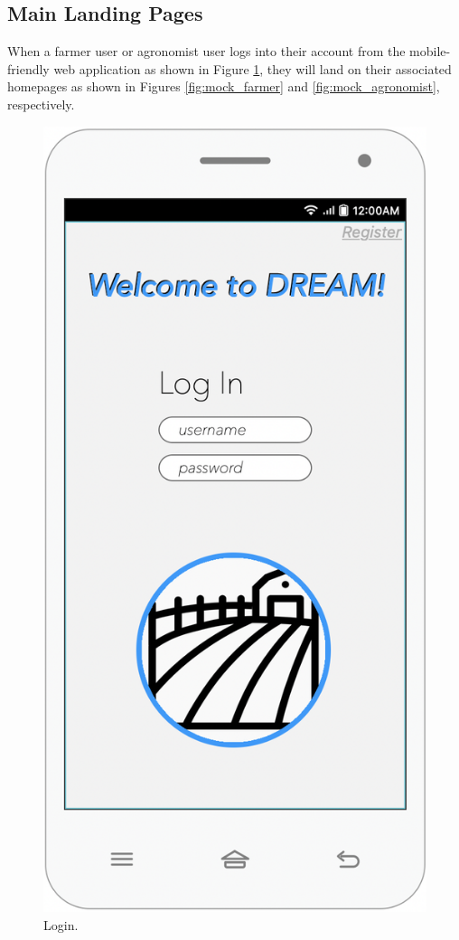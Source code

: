 \subsection{Main Landing Pages}
\noindent
When a farmer user or agronomist user logs into their account from the mobile-friendly web application as shown in Figure \ref{fig:mock_login}, they will land on their associated homepages as shown in Figures \ref{fig:mock_farmer} and \ref{fig:mock_agronomist}, respectively. 

\begin{multicols}{3}
\begin{figure}[H]
\centering
\includegraphics[scale=0.35]{../images_diagrams/mock_ups/login100.png}
\caption{\label{fig:mock_login}Login.}
\end{figure}


\end{multicols}

